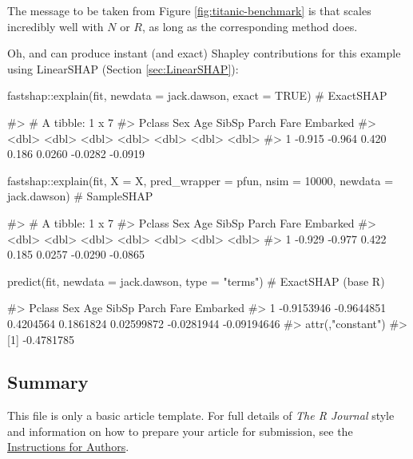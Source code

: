 The message to be taken from Figure \ref{fig:titanic-benchmark} is that
 scales incredibly well with \(N\) or \(R\), as long as
the corresponding  method does.

Oh, and  can produce instant (and exact) Shapley
contributions for this example using LinearSHAP (Section
\ref{sec:LinearSHAP}):

\begin{Schunk}
\begin{Sinput}
fastshap::explain(fit, newdata = jack.dawson, exact = TRUE)  # ExactSHAP
\end{Sinput}
\begin{Soutput}
#> # A tibble: 1 x 7
#>   Pclass    Sex   Age SibSp  Parch    Fare Embarked
#>    <dbl>  <dbl> <dbl> <dbl>  <dbl>   <dbl>    <dbl>
#> 1 -0.915 -0.964 0.420 0.186 0.0260 -0.0282  -0.0919
\end{Soutput}
\begin{Sinput}
fastshap::explain(fit, X = X, pred_wrapper = pfun, nsim = 10000,
                  newdata = jack.dawson)  # SampleSHAP
\end{Sinput}
\begin{Soutput}
#> # A tibble: 1 x 7
#>   Pclass    Sex   Age SibSp  Parch    Fare Embarked
#>    <dbl>  <dbl> <dbl> <dbl>  <dbl>   <dbl>    <dbl>
#> 1 -0.929 -0.977 0.422 0.185 0.0257 -0.0290  -0.0865
\end{Soutput}
\begin{Sinput}
predict(fit, newdata = jack.dawson, type = "terms")  # ExactSHAP (base R)
\end{Sinput}
\begin{Soutput}
#>       Pclass        Sex       Age     SibSp      Parch       Fare    Embarked
#> 1 -0.9153946 -0.9644851 0.4204564 0.1861824 0.02599872 -0.0281944 -0.09194646
#> attr(,"constant")
#> [1] -0.4781785
\end{Soutput}
\end{Schunk}

\hypertarget{summary}{%
\subsection{Summary}\label{summary}}

This file is only a basic article template. For full details of
\emph{The R Journal} style and information on how to prepare your
article for submission, see the
\href{https://journal.r-project.org/share/author-guide.pdf}{Instructions
for Authors}.

